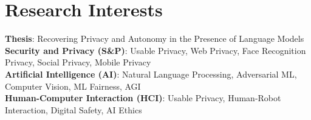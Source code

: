 \section{Research Interests}
 \begin{itemize}[leftmargin=0.5cm, label={}]
    \small{\item{
     \textbf{Thesis}{: Recovering Privacy and Autonomy in the Presence of Language Models} \\
     \textbf{Security and Privacy (S\&P)}{: Usable Privacy, Web Privacy, Face Recognition Privacy, Social Privacy, Mobile Privacy} \\
     \textbf{Artificial Intelligence (AI)}{: Natural Language Processing, Adversarial ML, Computer Vision, ML Fairness, AGI} \\
     \textbf{Human-Computer Interaction (HCI)}{: Usable Privacy, Human-Robot Interaction, Digital Safety, AI Ethics} \\
    }}
 \end{itemize}